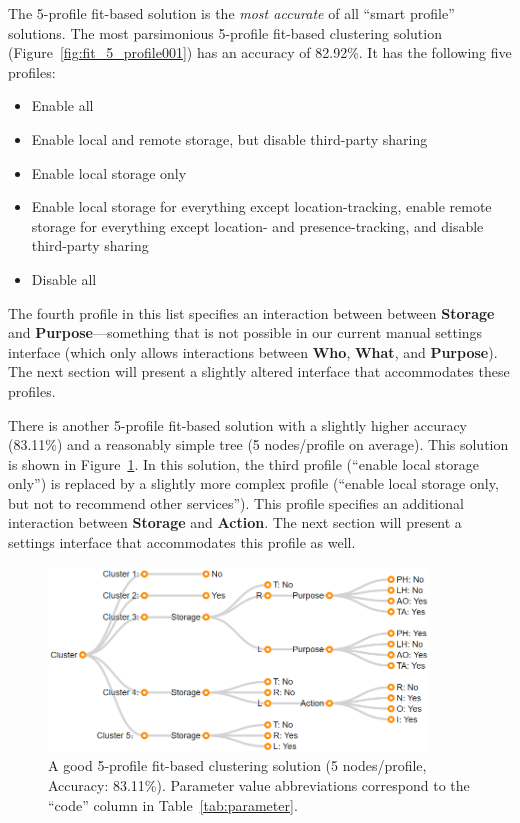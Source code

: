 The 5-profile fit-based solution is the \emph{most accurate} of all ``smart profile'' solutions. The most parsimonious 5-profile fit-based clustering solution (Figure~\ref{fig:fit_5_profile001}) has an accuracy of 82.92\%. It has the following five profiles:
\begin{itemize}
	\item Enable all
	\item Enable local and remote storage, but disable third-party sharing
	\item Enable local storage only
	\item Enable local storage for everything except location-tracking, enable remote storage for everything except location- and presence-tracking, and disable third-party sharing
	\item Disable all
\end{itemize}
The fourth profile in this list specifies an interaction between between \textbf{Storage} and \textbf{Purpose}---something that is not possible in our current manual settings interface (which only allows interactions between \textbf{Who}, \textbf{What}, and \textbf{Purpose}). The next section will present a slightly altered interface that accommodates these profiles.

There is another 5-profile fit-based solution with a slightly higher accuracy (83.11\%) and a reasonably simple tree (5 nodes/profile on average). This solution is shown in Figure~\ref{fig:fit_5_profile003}. In this solution, the third profile (``enable local storage only'') is replaced by a slightly more complex profile (``enable local storage only, but not to recommend other services''). This profile specifies an additional interaction between \textbf{Storage} and \textbf{Action}. The next section will present a settings interface that accommodates this profile as well.

\begin{figure}
	\centering
	\includegraphics[width=0.9\textwidth]{figures/fit_5_profile003.png}
	\caption{A good 5-profile fit-based clustering solution (5 nodes/profile, Accuracy: 83.11\%). Parameter value abbreviations correspond to the ``code'' column in Table~\ref{tab:parameter}.}
	\label{fig:fit_5_profile003}
\end{figure}

